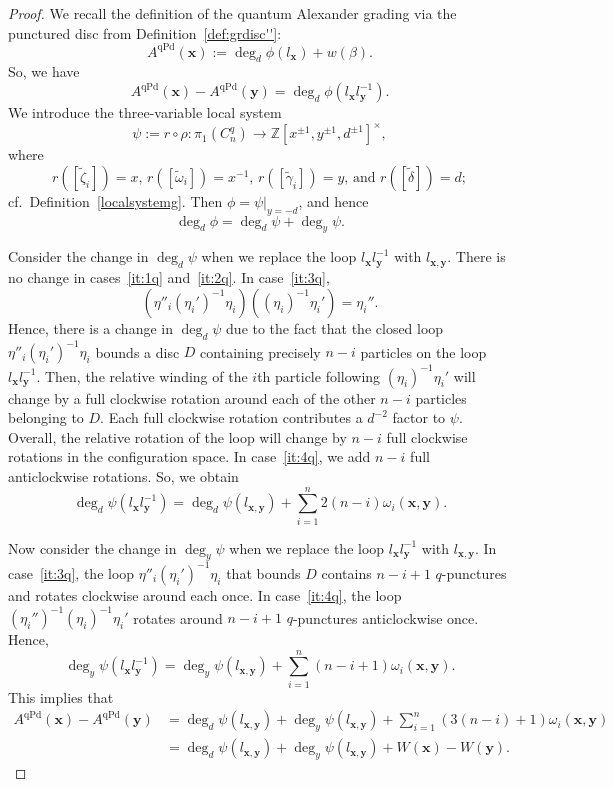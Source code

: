 \documentclass[11pt]{amsart}
\numberwithin{equation}{section}
\numberwithin{figure}{section}
\theoremstyle{definition}
\newcommand{\bZ}{\mathbb{Z}}
\DeclareMathOperator{\qPd}{qPd}
\newcommand{\xs}{\boldsymbol{x}}
\newcommand{\ys}{\boldsymbol{y}}
\begin{document}
\begin{proof}
We recall the definition of the quantum Alexander grading via the punctured disc from Definition~\ref{def:grdisc''}:
\begin{equation}
A^{\qPd}(\xs):=\deg_d \phi(l_{\xs}) + w(\beta).
\end{equation}
So, we have
\begin{equation}
A^{\qPd}(\xs)-A^{\qPd}(\ys)= \deg_d \phi(l_{\xs} l_{\ys}^{-1}).
\end{equation}
We introduce the three-variable local system 
\[
\psi := r \circ \rho \colon \pi_1(C^q_n) \to \bZ[x^{\pm 1}, y^{\pm 1}, d^{\pm 1}]^\times, 
\]
where
\[
r\left([\tilde{\zeta}_i]\right)= x \text{, } r\left([\tilde{\omega}_i]\right)= x^{-1} \text{, } r\left([\tilde{\gamma}_i]\right)= y \text{, and } r\left([\tilde{\delta}]\right)= d;
\]
cf.~Definition~\ref{localsystemg}. Then $\phi = \psi|_{y=-d}$, and hence
\[
\deg_d \phi = \deg_d \psi + \deg_y \psi.
\]

Consider the change in $\deg_d \psi$ when we replace the loop $l_{\xs} l_{\ys}^{-1}$ with $l_{\xs,\ys}$. There is no change in cases~\ref{it:1q} and~\ref{it:2q}. In case~\ref{it:3q}, 
\[
\left(\eta''_i(\eta_i')^{-1} \eta_i \right) \left((\eta_i)^{-1} \eta_i'\right) = \eta_i''.
\]
Hence, there is a change in $\deg_d \psi$ due to the fact that the closed loop $\eta''_i(\eta_i')^{-1} \eta_i$ bounds a disc $D$ containing precisely $n-i$ particles on the loop $l_{\xs} l_{\ys}^{-1}$. Then, the relative winding of the $i$th particle following $(\eta_i)^{-1} \eta_i'$ will change by a full clockwise rotation around each of the other $n-i$ particles belonging to $D$. Each full clockwise rotation contributes a $d^{-2}$ factor to $\psi$. Overall, the relative rotation of the loop will change by $n-i$ full clockwise rotations in the configuration space. In case~\ref{it:4q}, we add $n-i$ full anticlockwise rotations. So, we obtain
\begin{equation}
\deg_d \psi(l_{\xs} l_{\ys}^{-1})=\deg_d \psi(l_{\xs,\ys})+ \sum_{i=1}^{n} 2(n-i) \omega_i(\xs,\ys).
\end{equation}

Now consider the change in $\deg_y \psi$ when we replace the loop $l_{\xs} l_{\ys}^{-1}$ with $l_{\xs,\ys}$. In case~\ref{it:3q}, the loop $\eta''_i(\eta_i')^{-1} \eta_i$ that bounds $D$ contains $n-i+1$ $q$-punctures and rotates clockwise around each once. In case~\ref{it:4q}, the loop $(\eta_i'')^{-1}(\eta_i)^{-1} \eta_i'$ rotates around $n-i+1$ $q$-punctures anticlockwise once. Hence, 
\begin{equation}
\deg_y \psi(l_{\xs} l_{\ys}^{-1})=\deg_y \psi(l_{\xs,\ys})+\sum_{i=1}^n (n-i+1) \omega_i(\xs,\ys).
\end{equation}
This implies that
\begin{equation}\label{eqn:arc-change}
\begin{split}
A^{\qPd}(\xs)-A^{\qPd}(\ys) &= \deg_d \psi(l_{\xs,\ys}) + \deg_y \psi(l_{\xs,\ys}) + \sum_{i=1}^n (3(n-i)+1) \omega_i(\xs,\ys) \\
&= \deg_d \psi(l_{\xs,\ys}) + \deg_y \psi(l_{\xs,\ys}) + W(\xs) - W(\ys). 
\end{split}
\end{equation}


\end{proof}
\end{document}
